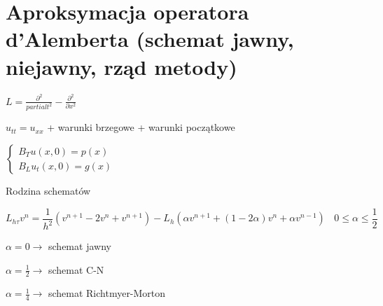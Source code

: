 \section{Aproksymacja operatora d'Alemberta (schemat jawny, niejawny, rząd metody)}

$L = \frac{\partial ^2}{partial t^2} - \frac{\partial ^2}{\partial x^2}$

$u_{tt} = u_{xx}$ + warunki brzegowe + warunki początkowe

$\left\{\begin{matrix} B_T u(x,0) = p(x) \\ B_L u_t(x,0) = g(x) \end{matrix}\right.$

Rodzina schematów

\[ L_{h\tau}v^n = \frac{1}{h^2}(v^{n+1} - 2v^n + v^{n+1}) - L_h(\alpha v^{n+1} + (1-2\alpha)v^n + \alpha v^{n-1})\ \ \ \ 0 \leqslant \alpha \leqslant \frac{1}{2}\]

$\alpha = 0 \rightarrow$ schemat jawny

$\alpha = \frac{1}{2} \rightarrow$ schemat C-N

$\alpha = \frac{1}{4} \rightarrow$ schemat Richtmyer-Morton